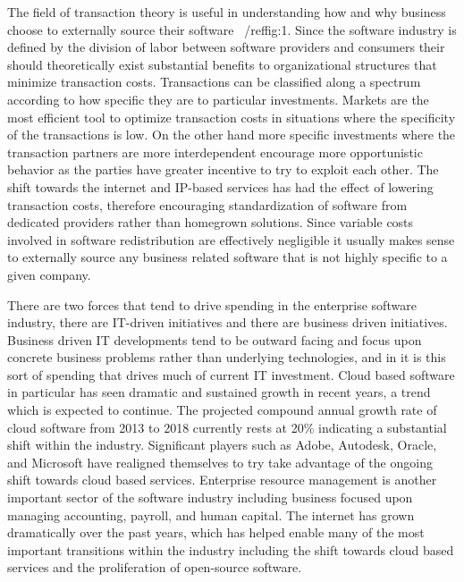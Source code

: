 The field of transaction theory is useful in understanding how and why business choose to externally source their software ~/ref{fig:1}.
Since the software industry is defined by the division of labor between software providers and consumers their should theoretically exist substantial benefits to organizational structures that minimize transaction costs.\autocite[42]{buxmann2012software}
Transactions can be classified along a spectrum according to how specific they are to particular investments.
Markets are the most efficient tool to optimize transaction costs in situations where the specificity of the transactions is low.
On the other hand more specific investments where the transaction partners are more interdependent encourage more opportunistic behavior as the parties have greater incentive to try to exploit each other.\autocite[44]{buxmann2012software}
The shift towards the internet and IP-based services has had the effect of lowering transaction costs, therefore encouraging standardization of software from dedicated providers rather than homegrown solutions.\autocite[46]{buxmann2012software}
Since variable costs involved in software redistribution are effectively negligible it usually makes sense to externally source any business related software that is not highly specific to a given company.

There are two forces that tend to drive spending in the enterprise software industry, there are IT-driven initiatives and there are business driven initiatives.\autocite[]{NextGenBusinessSoftware}
Business driven IT developments tend to be outward facing and focus upon concrete business problems rather than underlying technologies, and in it is this sort of spending that drives much of current IT investment.\autocite[]{NextGenBusinessSoftware}
Cloud based software in particular has seen dramatic and sustained growth in recent years, a trend which is expected to continue.
The projected compound annual growth rate of cloud software from 2013 to 2018 currently rests at 20\% indicating a substantial shift within the industry. Significant players such as Adobe, Autodesk, Oracle, and Microsoft have realigned themselves to try take advantage of the ongoing shift towards cloud based services.\autocite[40]{SurveysSoftware2015}
Enterprise resource management is another important sector of the software industry including business focused upon managing accounting, payroll, and human capital.\autocite[46]{SurveysSoftware2015}
The internet has grown dramatically over the past years, which has helped enable many of the most important transitions within the industry including the shift towards cloud based services and the proliferation of open-source software.\autocite[]{SurveysSoftware2015}

